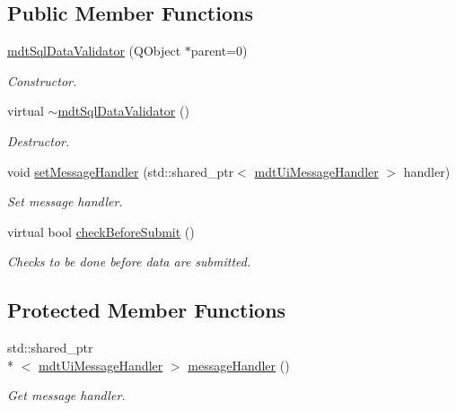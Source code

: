 \subsection*{Public Member Functions}
\begin{DoxyCompactItemize}
\item 
\hyperlink{classmdt_sql_data_validator_a24a295e08cac39244b35d409f48095f6}{mdt\-Sql\-Data\-Validator} (Q\-Object $\ast$parent=0)
\begin{DoxyCompactList}\small\item\em Constructor. \end{DoxyCompactList}\item 
virtual \hyperlink{classmdt_sql_data_validator_a2d1348a7035ac4fcf4f4cd47a6c2fa52}{$\sim$mdt\-Sql\-Data\-Validator} ()
\begin{DoxyCompactList}\small\item\em Destructor. \end{DoxyCompactList}\item 
void \hyperlink{classmdt_sql_data_validator_af09f6966469821b8e5d569bff0f51834}{set\-Message\-Handler} (std\-::shared\-\_\-ptr$<$ \hyperlink{classmdt_ui_message_handler}{mdt\-Ui\-Message\-Handler} $>$ handler)
\begin{DoxyCompactList}\small\item\em Set message handler. \end{DoxyCompactList}\item 
virtual bool \hyperlink{classmdt_sql_data_validator_af291c18e9c8994085ed4664db3fdcb7c}{check\-Before\-Submit} ()
\begin{DoxyCompactList}\small\item\em Checks to be done before data are submitted. \end{DoxyCompactList}\end{DoxyCompactItemize}
\subsection*{Protected Member Functions}
\begin{DoxyCompactItemize}
\item 
std\-::shared\-\_\-ptr\\*
$<$ \hyperlink{classmdt_ui_message_handler}{mdt\-Ui\-Message\-Handler} $>$ \hyperlink{classmdt_sql_data_validator_a56a4c215433676645ace1b5646fc1198}{message\-Handler} ()
\begin{DoxyCompactList}\small\item\em Get message handler. \end{DoxyCompactList}\end{DoxyCompactItemize}


